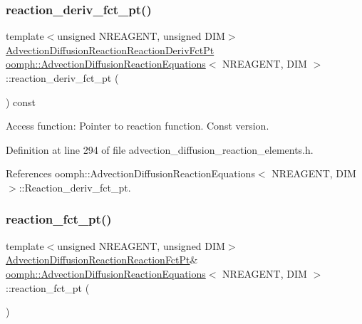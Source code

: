\subsubsection{\texorpdfstring{reaction\+\_\+deriv\+\_\+fct\+\_\+pt()}{reaction\_deriv\_fct\_pt()}\hspace{0.1cm}{\footnotesize\ttfamily [2/2]}}
{\footnotesize\ttfamily template$<$unsigned N\+R\+E\+A\+G\+E\+NT, unsigned D\+IM$>$ \\
\hyperlink{classoomph_1_1AdvectionDiffusionReactionEquations_af7afb472439d8e83b825c0a3c03190a7}{Advection\+Diffusion\+Reaction\+Reaction\+Deriv\+Fct\+Pt} \hyperlink{classoomph_1_1AdvectionDiffusionReactionEquations}{oomph\+::\+Advection\+Diffusion\+Reaction\+Equations}$<$ N\+R\+E\+A\+G\+E\+NT, D\+IM $>$\+::reaction\+\_\+deriv\+\_\+fct\+\_\+pt (\begin{DoxyParamCaption}{ }\end{DoxyParamCaption}) const\hspace{0.3cm}{\ttfamily [inline]}}



Access function\+: Pointer to reaction function. Const version. 



Definition at line 294 of file advection\+\_\+diffusion\+\_\+reaction\+\_\+elements.\+h.



References oomph\+::\+Advection\+Diffusion\+Reaction\+Equations$<$ N\+R\+E\+A\+G\+E\+N\+T, D\+I\+M $>$\+::\+Reaction\+\_\+deriv\+\_\+fct\+\_\+pt.

\mbox{\label{classoomph_1_1AdvectionDiffusionReactionEquations_a4c7f533fafad4d0db6f2e4cf0b3f97ca}} 
\subsubsection{\texorpdfstring{reaction\+\_\+fct\+\_\+pt()}{reaction\_fct\_pt()}\hspace{0.1cm}{\footnotesize\ttfamily [1/2]}}
{\footnotesize\ttfamily template$<$unsigned N\+R\+E\+A\+G\+E\+NT, unsigned D\+IM$>$ \\
\hyperlink{classoomph_1_1AdvectionDiffusionReactionEquations_a74f8f0492147a5600b075cc64479f850}{Advection\+Diffusion\+Reaction\+Reaction\+Fct\+Pt}\& \hyperlink{classoomph_1_1AdvectionDiffusionReactionEquations}{oomph\+::\+Advection\+Diffusion\+Reaction\+Equations}$<$ N\+R\+E\+A\+G\+E\+NT, D\+IM $>$\+::reaction\+\_\+fct\+\_\+pt (\begin{DoxyParamCaption}{ }\end{DoxyParamCaption})\hspace{0.3cm}{\ttfamily [inline]}}



